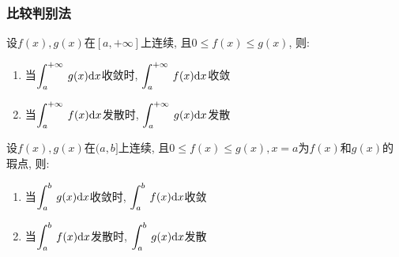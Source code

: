 \subsubsection{比较判别法}
\par \vspace{.5em}
设$ f(x), g(x) $在$ [a,+\infty] $上连续, 且$ 0\le f(x)\le g(x) $, 则:
\begin{enumerate}
\item 当$ \displaystyle\int_{a}^{+\infty}\hspace{.2em}g(x)\mathrm{d}x $收敛时, $ \displaystyle\int_{a}^{+\infty}\hspace{.2em}f(x)\mathrm{d}x $收敛
\item 当$ \displaystyle\int_{a}^{+\infty}\hspace{.2em}f(x)\mathrm{d}x $发散时, $ \displaystyle\int_{a}^{+\infty}\hspace{.2em}g(x)\mathrm{d}x $发散
\end{enumerate}
\par \vspace{.5em}
设$ f(x), g(x) $在$ (a,b] $上连续, 且$ 0\le f(x)\le g(x), x=a $为$ f(x) $和$ g(x) $的瑕点, 则:
\begin{enumerate}
\item 当$ \displaystyle\int_{a}^{b}\hspace{.2em}g(x)\mathrm{d}x $收敛时, $ \displaystyle\int_{a}^{b}\hspace{.2em}f(x)\mathrm{d}x $收敛
\item 当$ \displaystyle\int_{a}^{b}\hspace{.2em}f(x)\mathrm{d}x $发散时, $ \displaystyle\int_{a}^{b}\hspace{.2em}g(x)\mathrm{d}x $发散
\end{enumerate}
